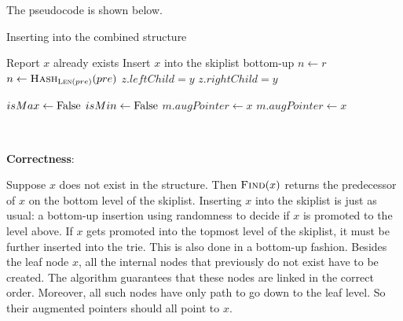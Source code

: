 \documentclass{article}
\begin{document}
The pseudocode is shown below.
\begin{algorithm}
\caption{Inserting into the combined structure}
\begin{algorithmic}[1]
 {Report $x$ already exists}
\Else{} {Insert $x$ into the skiplist bottom-up}
\EndIf
{}
		 {$n\gets r$}
		\Else{} {$n\gets\textsc{Hash}_{\textsc{Len}(pre)}(pre)$}
		\EndIf
			 {$z.leftChild=y$}
			\Else{} {$z.rightChild=y$}
			
			\EndIf
		\EndIf
	\EndWhile
	\Else{}
	\EndIf
			 {$isMax\gets\textup{False}$}
			 {$isMin\gets\textup{False}$}
			\EndIf
		\Else{}
			 {$m.augPointer\gets x$}
			 {$m.augPointer\gets x$}
			\EndIf
		\EndIf
	\EndWhile
\EndIf
\EndProcedure
\end{algorithmic}
\end{algorithm}

~

\noindent\textbf{Correctness}:

Suppose $x$ does not exist in the structure. Then $\textsc{Find}(x)$ returns the predecessor of $x$ on the bottom level of the skiplist. Inserting $x$ into the skiplist is just as usual: a bottom-up insertion using randomness to decide if $x$ is promoted to the level above. If $x$ gets promoted into the topmost level of the skiplist, it must be further inserted into the trie. This is also done in a bottom-up fashion. Besides the leaf node $x$, all the internal nodes that previously do not exist have to be created. The algorithm guarantees that these nodes are linked in the correct order. Moreover, all such nodes have only path to go down to the leaf level. So their augmented pointers should all point to $x$.
\end{document}
